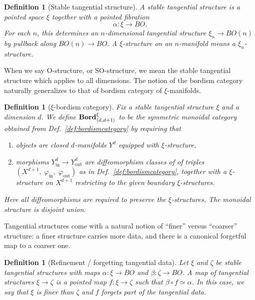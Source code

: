 \documentclass[aps,prx,reprint,superscriptaddress,twocolumn,amsmath,amssymb,amsfonts, nofootinbib]{revtex4-2}
\newcommand{\SO}{\text{SO}}
\newcommand{\bordd}{{\bf Bord}_{\langle d, d+1\rangle}}
\theoremstyle{apsstyle}
\newtheorem{definition}[theorem]{Definition}
\begin{document}
\bigskip 

\begin{definition}[Stable tangential structure]
\label{def:stable_tangential_structure}
A \emph{stable tangential structure} is a pointed space $\xi$ together with a
pointed fibration
\begin{equation}
    \alpha:\xi \longrightarrow BO.
\end{equation}
For each $n$, this determines an $n$-dimensional tangential structure
$\xi_n\to BO(n)$ by pullback along $BO(n)\to BO$. A \emph{$\xi$-structure} on an $n$-manifold means a $\xi_n$-structure.
\end{definition}

\bigskip 

\noindent When we say $\mathrm{O}$-structure, or $\SO$-structure, we mean the stable tangential structure which applies to all dimensions. The notion of the bordism category naturally generalizes to that of bordism category of $\xi$-manifolds.

\bigskip 

\begin{definition}[$\xi$-bordism category]
\label{def:bordismcategory_zeta}
Fix a stable tangential structure $\xi$ and a dimension $d$.
We define $\bordd^{\xi}$ to be the symmetric monoidal category obtained from Def.~\ref{def:bordismcategory} by requiring that
\begin{enumerate}[label=\roman*,leftmargin=1.7em]
\item objects are closed $d$-manifolds $Y^{d}$ equipped with $\xi$-structure,
\item morphisms $Y^{d}_{\mathrm{in}}\to Y^{d}_{\mathrm{out}}$ are diffeomorphism classes of of triples $(X^{d+1},\;\varphi_{\mathrm{in}},\;\varphi_{\mathrm{out}})$ as in Def.~\ref{def:bordismcategory}, together with a $\xi$-structure on $X^{d+1}$ restricting to the given boundary $\xi$-structures.
\end{enumerate}
Here all diffeomorphisms are required to preserve the $\xi$-structures. The monoidal structure is disjoint union.
\end{definition}

\bigskip 

\noindent Tangential structures come with a natural notion of ``finer'' versus ``coarser''
structure: a finer structure carries more data, and there is a canonical
forgetful map to a coarser one.

\bigskip 

\begin{definition}[Refinement / forgetting tangential data]
\label{def:refinement_tangential}
Let $\xi$ and $\zeta$ be stable tangential structures with maps
$\alpha:\xi\to BO$ and $\beta:\zeta\to BO$. A \emph{map of tangential structures} $\xi\to \zeta$ is a pointed map
$f:\xi\to \zeta$ such that $\beta\circ f\simeq \alpha$.
In this case, we say that $\xi$ is \emph{finer} than $\zeta$ and $f$ \emph{forgets}
part of the tangential data.
\end{definition}
\end{document}
